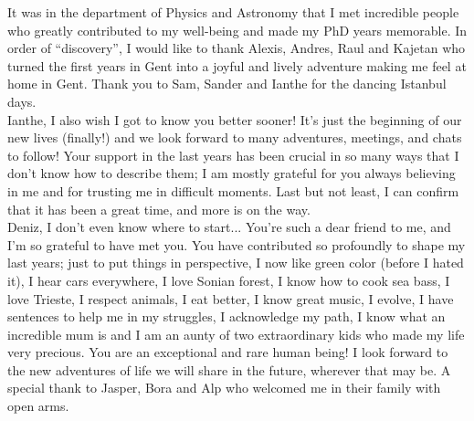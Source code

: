 \begin{acknowledgements}
{It was in the department of Physics and Astronomy that I met incredible people who greatly contributed to my well-being and made my PhD years memorable.  In order of ``discovery'', I would like to thank Alexis, Andres, Raul and Kajetan who turned the first years in Gent into a joyful and lively adventure making me feel at home in Gent. Thank you to Sam, Sander and Ianthe for the dancing Istanbul days. \\
Ianthe, I also wish I got to know you better sooner! It's just the beginning of our new lives (finally!) and we look forward to many adventures, meetings, and chats to follow! Your support in the last years has been crucial in so many ways that I don't know how to describe them; I am mostly grateful for you always believing in me and for trusting me in difficult moments. Last but not least, I can confirm that it has been a great time, and more is on the way. \\
Deniz, I don't even know where to start... You're such a dear friend to me, and I'm so grateful to have met you. You have contributed so profoundly to shape my last years; just to put things in perspective, I now like green color (before I hated it), I hear cars everywhere, I love Sonian forest, I know how to cook sea bass, I love Trieste, I respect animals, I eat better, I know great music, I evolve, I have sentences to help me in my struggles, I acknowledge my path, I know what an incredible mum is and I am an aunty of two extraordinary kids who made my life very precious. You are an exceptional and rare human being! I look forward to the new adventures of life we will share in the future, wherever that may be. A special thank to Jasper, Bora and Alp who welcomed me in their family with open arms.\\

}
\end{acknowledgements}
